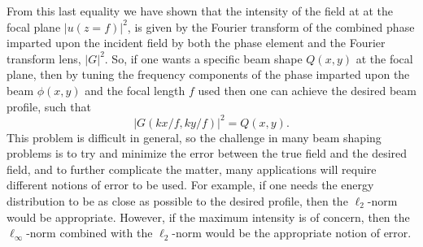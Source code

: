 From this last equality we have shown that the intensity of the field at at the focal plane $\rvert u(z=f)\rvert^2$, is given by the Fourier transform of the combined phase imparted upon the incident field by both the phase element and the Fourier transform lens, $\rvert G\rvert^2$. So, if one wants a specific beam shape $Q(x,y)$ at the focal plane, then by tuning the frequency components of the phase imparted upon the beam $\phi(x,y)$ and the focal length $f$ used then one can achieve the desired beam profile, such that
\begin{equation}
\label{eqn:beam_shaping_equality}
	\rvert G(kx/f,ky/f)\rvert^2=Q(x,y).
\end{equation}
This problem is difficult in general, so the challenge in many beam shaping problems is to try and minimize the error between the true field and the desired field, and to further complicate the matter, many applications will require different notions of error to be used.  For example, if one needs the energy distribution to be as close as possible to the desired profile, then the $\ell_2$-norm would be appropriate.  However, if the maximum intensity is of concern, then the $\ell_\infty$-norm combined with the $\ell_2$-norm would be the appropriate notion of error.

